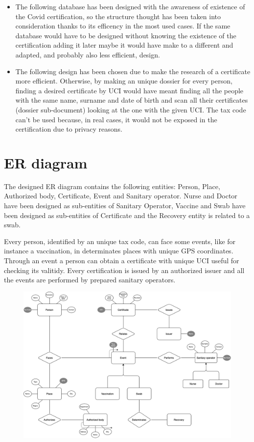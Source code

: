 \documentclass{article}
\begin{document}
\begin{itemize}
\item The following database has been designed with the awareness of existence of the Covid certification, so the structure thought has been taken into consideration thanks to its efficency in the most used cases. If the same database would have to be designed without knowing the existence of the certification adding it later maybe it would have make to a different and adapted, and probably also less efficient, design.
\item The following design has been chosen due to make the research of a certificate more efficient. Otherwise, by making an unique dossier for every person, finding a desired certificate by UCI would have meant finding all the people with the same name, surname and date of birth and scan all their certificates (dossier sub-document) looking at the one with the given UCI. The tax code can't be used because, in real cases, it would not be exposed in the certification due to privacy reasons.

\end{itemize}
\newpage
\section{ER diagram}
The designed ER diagram contains the following entities: Person, Place, Authorized body, Certificate, Event and Sanitary operator. Nurse and Doctor have been designed as sub-entities of Sanitary Operator, Vaccine and Swab have been designed as sub-entities of Certificate and the Recovery entity is related to a swab.

Every person, identified by an unique tax code, can face some events, like for instance a vaccination, in determinates places with unique GPS coordinates. Through an event a person can obtain a certificate with unique UCI useful for checking its valitidy. Every certification is issued by an authorized issuer and all the events are performed by prepared sanitary operators.

\hfill\break
\hfill\break
\hfill\break


\begin{figure}[h!]
\centering
\includegraphics[scale=0.30]{er.png}
\end{figure}
\newpage
\end{document}
